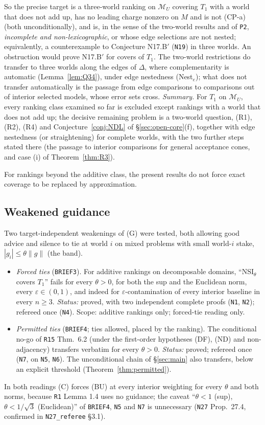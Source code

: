 \documentclass[11pt]{article}
\theoremstyle{definition}
\theoremstyle{remark}
\newcommand{\M}{\mathcal M}
\newcommand{\src}[1]{\texttt{#1}}
\begin{document}
So the precise target is a three-world ranking on $\M_U$ covering $T_1$ with a world that does not add up, has no leading charge nonzero on $M$ and is not (CP-a) (both unconditionally), and is, in the sense of the two-world results and of \src{P2}, \emph{incomplete and non-lexicographic}, or whose edge selections are not nested; equivalently, a counterexample to Conjecture N17.B$'$ (\src{N19}) in three worlds. An obstruction would prove N17.B$'$ for covers of $T_1$. The two-world restrictions do transfer to three worlds along the edges of $\Delta$, where complementarity is automatic (Lemma~\ref{lem:Q34}), under edge nestedness (Nest$_e$); what does not transfer automatically is the passage from edge comparisons to comparisons out of interior selected models, whose error sets cross. \emph{Summary.} For $T_1$ on $\M_U$, every ranking class examined so far is excluded except rankings with a world that does not add up; the decisive remaining problem is a two-world question, (R1), (R2), (R4) and Conjecture~\ref{conj:NDL} of \S\ref{sec:open-core}(f), together with edge nestedness (or straightening) for complete worlds, with the two further steps stated there (the passage to interior comparisons for general acceptance cones, and case (i) of Theorem~\ref{thm:R3}).

For rankings beyond the additive class, the present results do not force exact coverage to be replaced by approximation.

\subsection{Weakened guidance}\label{sec:open-ties}
Two target-independent weakenings of (G) were tested, both allowing good advice and silence to tie at world $i$ on mixed problems with small world-$i$ stake, $|g_i|\le\theta\|g\|$ (the band).
\begin{itemize}[leftmargin=*]
\item \emph{Forced ties} (\src{BRIEF3}). For additive rankings on decomposable domains, ``NSI$_\theta$ covers $T_1$'' fails for every $\theta>0$, for both the sup and the Euclidean norm, every $\varepsilon\in(0,1)$, and indeed for $\varepsilon$-contamination of every interior baseline in every $n\ge3$. \emph{Status:} proved, with two independent complete proofs (\src{N1}, \src{N2}); refereed once (\src{N4}). Scope: additive rankings only; forced-tie reading only.
\item \emph{Permitted ties} (\src{BRIEF4}; ties allowed, placed by the ranking). The conditional no-go of \src{R15} Thm.~6.2 (under the first-order hypotheses (DF), (ND) and non-adjacency) transfers verbatim for every $\theta>0$. \emph{Status:} proved; refereed once (\src{N7}, on \src{N5}, \src{N6}). The unconditional chain of \S\ref{sec:main} also transfers, below an explicit threshold (Theorem~\ref{thm:permitted}).
\end{itemize}
In both readings (C) forces (BU) at every interior weighting for every $\theta$ and both norms, because \src{R1} Lemma 1.4 uses no guidance; the caveat ``$\theta<1$ (sup), $\theta<1/\sqrt3$ (Euclidean)'' of \src{BRIEF4}, \src{N5} and \src{N7} is unnecessary (\src{N27} Prop.~27.4, confirmed in \src{N27\_referee} \S3.1).
\end{document}
